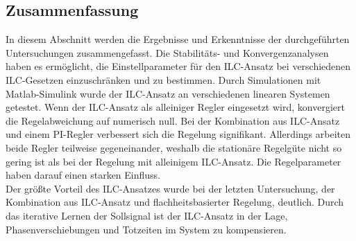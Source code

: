 \subsection{Zusammenfassung}
In diesem Abschnitt werden die Ergebnisse und Erkenntnisse der durchgeführten Untersuchungen zusammengefasst. Die Stabilitäts- und Konvergenzanalysen haben es ermöglicht, die Einstellparameter für den ILC-Ansatz bei verschiedenen ILC-Gesetzen einzuschränken und zu bestimmen. Durch Simulationen mit Matlab-Simulink wurde der ILC-Ansatz an verschiedenen linearen Systemen getestet. Wenn der ILC-Ansatz als alleiniger Regler eingesetzt wird, konvergiert die Regelabweichung auf numerisch null. Bei der Kombination aus ILC-Ansatz und einem PI-Regler verbessert sich die Regelung signifikant. Allerdings arbeiten beide Regler teilweise gegeneinander, weshalb die stationäre Regelgüte nicht so gering ist als bei der Regelung mit alleinigem ILC-Ansatz. Die Regelparameter haben darauf einen starken Einfluss.\\
Der größte Vorteil des ILC-Ansatzes wurde bei der letzten Untersuchung, der Kombination aus ILC-Ansatz und flachheitsbasierter Regelung, deutlich. Durch das iterative Lernen der Sollsignal ist der ILC-Ansatz in der Lage, Phasenverschiebungen und Totzeiten im System zu kompensieren.